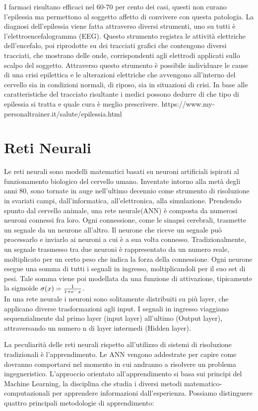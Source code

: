 \documentclass{article}
\begin{document}
I farmaci risultano efficaci nel 60-70 per cento dei casi, questi non curano l'epilessia ma permettono al soggetto affetto di convivere con questa patologia.
 La diagnosi dell'epilessia viene fatta attraverso diversi strumenti, uno su tutti è l'elettroencefalogramma (EEG). Questo strumento registra le attività elettriche dell'encefalo, poi riprodotte su dei tracciati grafici che contengono diversi tracciati,  che mostrano delle onde, corrispondenti agli elettrodi applicati sullo scalpo del soggetto.
 Attraverso questo strumento è possibile individuare le cause di una crisi epilettica e le alterazioni  elettriche che avvengono all'interno del cervello sia in condizioni normali, di riposo, sia in situazioni di crisi. In base alle caratteristiche del tracciato risultante i medici possono dedurre di che tipo di epilessia si tratta e quale cura è meglio prescrivere. 
https://www.my-personaltrainer.it/salute/epilessia.html


\section{Reti Neurali}
Le reti neurali sono modelli matematici basati su neuroni artificiali ispirati al funzionamento biologico del cervello umano. Inventate intorno alla metà degli anni 80, sono tornate in auge nell'ultimo decennio come strumento di risoluzione in svariati campi, dall'informatica, all'elettronica, alla simulazione. 
Prendendo spunto dal cervello animale, una rete neurale(ANN) è composta da numerosi neuroni connessi fra loro. Ogni connessione, come le sinapsi cerebrali, trasmette un segnale da un neurone all'altro. Il neurone che riceve un segnale può processarlo e inviarlo ai neuroni a cui è a sua volta connesso. Tradizionalmente, un segnale trasmesso tra due neuroni è rappresentato da un numero reale, moltiplicato per un certo peso che indica la forza della connessione. Ogni neurone esegue una somma di tutti i segnali in ingresso, moltiplicandoli per il suo set di pesi. Tale somma viene poi modellata da una funzione di attivazione, tipicamente la sigmoide
$\sigma(x) = {1 \over 1+e^-x}$.\\
In una rete neurale i neuroni sono solitamente distribuiti su più layer, che applicano diverse trasformazioni agli input. I segnali in ingresso viaggiano sequenzialmente dal primo layer (input layer) all'ultimo (Output layer), attraversando un numero n di layer intermedi (Hidden layer).

La peculiarità delle reti neurali rispetto all'utilizzo di sistemi di risoluzione tradizionali è l'apprendimento. Le ANN vengono addestrate per capire come dovranno comportarsi nel momento in cui andranno a risolvere un problema ingegneristico. L'approccio orientato all'apprendimento si basa sui principi del Machine Learning, la disciplina che studia i diversi metodi matematico-computazionali per apprendere informazioni dall'esperienza. Possiamo distinguere quattro principali metodologie di apprendimento:
\end{document}
